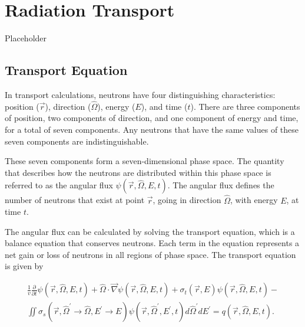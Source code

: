 \section{Radiation Transport}
\label{sec:bg:rt}

Placeholder

\subsection{Transport Equation}
\label{sec:bg:rt:te}

In transport calculations, neutrons have four distinguishing characteristics: position ($\vec{r}$), direction ($\hat{\Omega}$), energy ($E$), and time ($t$).
There are three components of position, two components of direction, and one component of energy and time, for a total of seven components.
Any neutrons that have the same values of these seven components are indistinguishable.

These seven components form a seven-dimensional phase space.
The quantity that describes how the neutrons are distributed within this phase space is referred to as the angular flux $\psi\left(\vec{r},\hat{\Omega},E,t\right)$.
The angular flux defines the number of neutrons that exist at point $\vec{r}$, going in direction ${\hat{\Omega}}$, with energy $E$, at time $t$.

The angular flux can be calculated by solving the transport equation, which is a balance equation that conserves neutrons.
Each term in the equation represents a net gain or loss of neutrons in all regions of phase space.
The transport equation is given by

\begin{multline}
  \frac{1}{v}\frac{\partial}{\partial t}\psi\left(\vec{r},\hat{\Omega},E,t\right) +
  \hat{\Omega}\cdot\vec{\nabla}\psi\left(\vec{r},\hat{\Omega},E,t\right) +
  \sigma_t\left(\vec{r},E\right)\psi\left(\vec{r},\hat{\Omega},E,t\right) - \\
  \iint\sigma_s\left(\vec{r},\hat{\Omega}^\prime\rightarrow\hat{\Omega},E^\prime\rightarrow E\right)\psi\left(\vec{r},\hat{\Omega}^\prime,E^\prime,t\right)d\hat{\Omega}^\prime dE^\prime =
  q\left(\vec{r},\hat{\Omega},E,t\right).
\end{multline}

